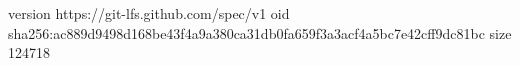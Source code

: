 version https://git-lfs.github.com/spec/v1
oid sha256:ac889d9498d168be43f4a9a380ca31db0fa659f3a3acf4a5bc7e42cff9dc81bc
size 124718
